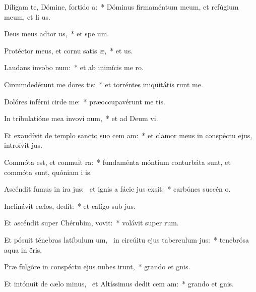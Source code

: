 \item Díligam te, Dómine, fortido a:~* Dóminus firmaméntum meum, et refúgium meum, et li us.
\item Deus meus adtor us,~* et spe  um.
\item Protéctor meus, et cornu satis æ,~* et  us.
\item Laudans invobo num:~* et ab inimícis me  ro.
\item Circumdedérunt me dores tis:~* et torréntes iniquitátis runt me.
\item Dolóres inférni cirde me:~* præoccupavérunt me  tis.
\item In tribulatióne mea invovi num,~* et ad Deum  vi.
\item Et exaudívit de templo sancto suo cem am:~* et clamor meus in conspéctu ejus, introívit   jus.
\item Commóta est, et conmuit ra:~* fundaménta móntium conturbáta sunt, et commóta sunt, quóniam i  is.
\item Ascéndit fumus in ira jus:~\pscross{} et ignis a fácie jus exsit:~* carbónes succén   o.
\item Inclinávit cælos,  dedit:~* et calígo sub  jus.
\item Et ascéndit super Chérubim,  vovit:~* volávit super  rum.
\item Et pósuit ténebras latíbulum um,~\pscross{} in circúitu ejus taberculum jus:~* tenebrósa aqua in  ëris.
\item Præ fulgóre in conspéctu ejus nubes irunt,~* grando et  gnis.
\item Et intónuit de cælo minus,~\pscross{} et Altíssimus dedit cem am:~* grando et  gnis.
